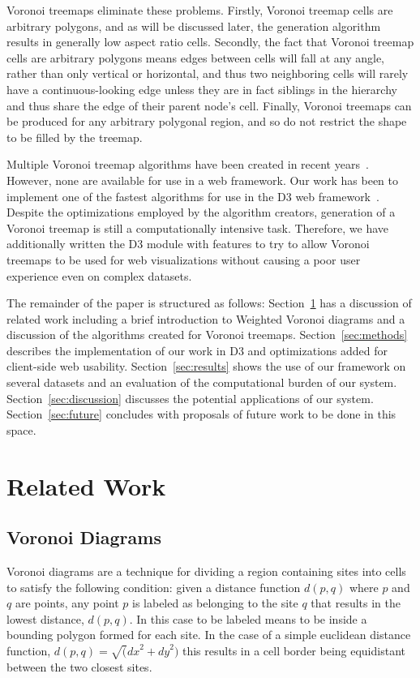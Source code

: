 \documentclass{acm_proc_article-sp} \usepackage{cite}
\begin{document}
Voronoi treemaps eliminate these problems. Firstly, Voronoi treemap
cells are arbitrary polygons, and as will be discussed later, the
generation algorithm results in generally low aspect ratio
cells. Secondly, the fact that Voronoi treemap cells are arbitrary
polygons means edges between cells will fall at any angle, rather than
only vertical or horizontal, and thus two neighboring cells will
rarely have a continuous-looking edge unless they are in fact
siblings in the hierarchy and thus share the edge of their parent
node's cell. Finally, Voronoi treemaps can be produced for any
arbitrary polygonal region, and so do not restrict the shape to be
filled by the treemap.

Multiple Voronoi treemap algorithms have been created in recent 
years~\cite{balzer:treemaps, sud:fast, nocaj:faster}. However,
none are available for use in a web framework.  Our work has been to
implement one of the fastest algorithms for use in the D3 web
framework~\cite{Bostock2011}. Despite the optimizations employed by the algorithm
creators, generation of a Voronoi treemap is still a computationally
intensive task. Therefore, we have additionally written the D3 module
with features to try to allow Voronoi treemaps to be used for web
visualizations without causing a poor user experience even on complex
datasets.

The remainder of the paper is structured as follows: Section~\ref{sec:related} has a
discussion of related work including a brief introduction to Weighted
Voronoi diagrams and a discussion of the algorithms created for
Voronoi treemaps. Section~\ref{sec:methods} describes the implementation of our work
in D3 and optimizations added for client-side web usability. Section~\ref{sec:results}
shows the use of our framework on several datasets and an evaluation
of the computational burden of our system. Section~\ref{sec:discussion} discusses the
potential applications of our system. Section~\ref{sec:future} concludes with
proposals of future work to be done in this space.

\section{Related Work}
\label{sec:related}

\subsection{Voronoi Diagrams}
Voronoi diagrams are a technique for dividing a region containing
sites into cells to satisfy the following condition: given a distance
function $d(p, q)$ where $p$ and $q$ are points, any point $p$ is
labeled as belonging to the site $q$ that results in the lowest
distance, $d(p,q)$. In this case to be labeled means to be inside a
bounding polygon formed for each site. In the case of a simple
euclidean distance function, $d(p,q) = \sqrt({dx}^2 + {dy}^2)$ this
results in a cell border being equidistant between the two closest
sites.
\end{document}
